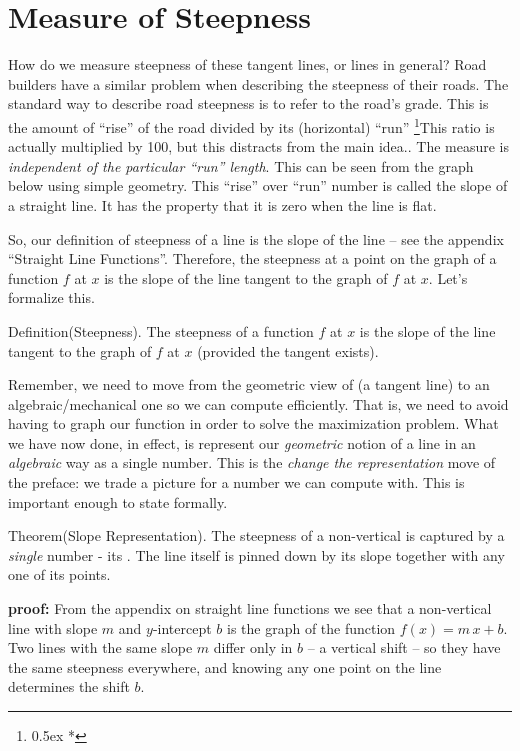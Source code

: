 \section{Measure of Steepness}
How do we measure steepness of these tangent lines, or lines in general? 
Road builders have a similar problem when describing the steepness of their 
roads. The standard way to describe road steepness
is to refer to the road's grade. This is the amount 
of ``rise'' of the road divided by its (horizontal) ``run''%
\footnote{\kern 0.5pt \raise 0.5ex \hbox{*}}{This ratio is actually multiplied 
by 100, but this distracts from the main idea.}. 
The measure is 
{\it independent of the particular ``run'' length\/}. 
This can be seen from the
graph below using simple geometry. This ``rise'' over ``run'' 
number is called the 
slope of a straight line. It has the property that it is zero when 
the line is flat.

So, our definition of steepness of a line is the slope of the line -- see the appendix ``Straight Line Functions''. 
Therefore,
the steepness at a point on the graph of a function $f$ at $x$ is the 
slope of the line tangent to the graph of $f$ at $x$. Let's formalize this.

\proclaim Definition(Steepness). The steepness of a function $f$ at $x$ is
the slope of the line tangent to the graph of $f$ at $x$ 
(provided the tangent exists).

Remember, we need to move from the geometric view of   (a tangent line)
to an algebraic/mechanical one so we can compute efficiently. That is, we need to avoid having
to graph our function in order to solve the maximization problem.
What we have now done, in effect, is represent our {\it geometric\/}
notion of a  line in an {\it algebraic\/} way as
a single number. This is the {\it change the representation\/} move of the
preface: we trade a picture for a number we can compute with.
This is important enough to state formally.

\proclaim Theorem(Slope Representation). The steepness of a non-vertical
 is captured by a {\it single\/} number - its .
The line itself is pinned down by its slope together with any one of its points.

{\bf proof:\/} From the appendix on straight line functions we see that
a non-vertical line with slope $m$ and $y$-intercept $b$ is the graph
of the function $f(x) = m\,x + b$. Two lines with the same slope $m$ differ
only in $b$ -- a vertical shift -- so they have the same steepness everywhere,
and knowing any one point on the line determines the shift $b$.

